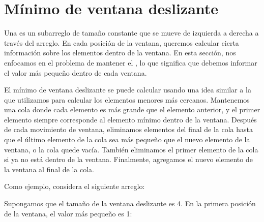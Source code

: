 \section{Mínimo de ventana deslizante}


Una  es un subarreglo de tamaño constante
que se mueve de izquierda a derecha a través del arreglo.
En cada posición de la ventana,
queremos calcular cierta información
sobre los elementos dentro de la ventana.
En esta sección, nos enfocamos en el problema
de mantener el ,
lo que significa que
debemos informar el valor más pequeño dentro de cada ventana.

El mínimo de ventana deslizante se puede calcular
usando una idea similar a la que utilizamos para calcular
los elementos menores más cercanos.
Mantenemos una cola
donde cada elemento es más grande que
el elemento anterior,
y el primer elemento
siempre corresponde al elemento mínimo dentro de la ventana.
Después de cada movimiento de ventana,
eliminamos elementos del final de la cola
hasta que el último elemento de la cola
sea más pequeño que el nuevo elemento de la ventana,
o la cola quede vacía.
También eliminamos el primer elemento de la cola
si ya no está dentro de la ventana.
Finalmente, agregamos el nuevo elemento de la ventana
al final de la cola.

Como ejemplo, considera el siguiente arreglo:

\begin{center}
\end{center}

Supongamos que el tamaño de la ventana deslizante es 4.
En la primera posición de la ventana, el valor más pequeño es 1:
\begin{center}
\end{center}

